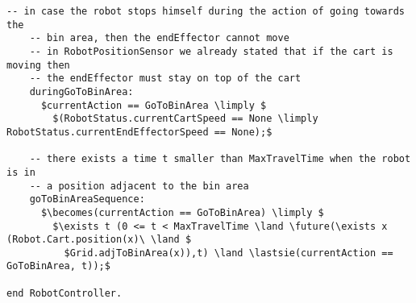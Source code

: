 \begin{lstlisting}[fontadjust, mathescape, frame=single]
    -- in case the robot stops himself during the action of going towards the 
    -- bin area, then the endEffector cannot move
    -- in RobotPositionSensor we already stated that if the cart is moving then 
    -- the endEffector must stay on top of the cart
    duringGoToBinArea:
      $currentAction == GoToBinArea \limply $
        $(RobotStatus.currentCartSpeed == None \limply RobotStatus.currentEndEffectorSpeed == None);$

    -- there exists a time t smaller than MaxTravelTime when the robot is in 
    -- a position adjacent to the bin area
    goToBinAreaSequence:
      $\becomes(currentAction == GoToBinArea) \limply $
        $\exists t (0 <= t < MaxTravelTime \land \future(\exists x (Robot.Cart.position(x)\ \land $
          $Grid.adjToBinArea(x)),t) \land \lastsie(currentAction == GoToBinArea, t));$
                      
end RobotController.
\end{lstlisting}